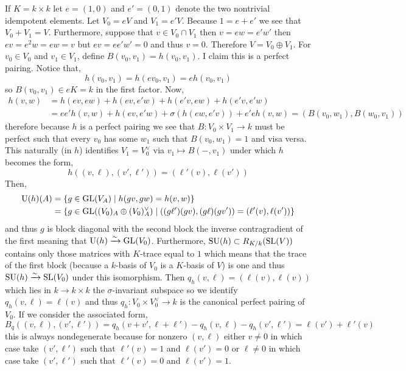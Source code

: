 \documentclass[12pt]{article}
\begin{document}
If $K = k \times k$ let $e = (1,0)$ and $e' = (0,1)$ denote the two nontrivial idempotent elements. Let $V_0 = e V$ and $V_1 = e' V$.
Because $1 = e + e'$ we see that $V_0 + V_1 = V$. Furthermore, suppose that $v \in V_0 \cap V_1$ then $v = e w = e' w'$ then $ev = e^2 w = ew = v$ but $ev = ee'w' = 0$ and thus $v = 0$. Therefore $V = V_0 \oplus V_1$. For $v_0 \in V_0$ and $v_1 \in V_1$, define $B(v_0, v_1) = h(v_0, v_1)$. I claim this is a perfect pairing. Notice that,
\[ h(v_0, v_1) = h(e v_0, v_1) = e h(v_0, v_1) \]
so $B(v_0, v_1) \in e K = k$ in the first factor. Now,
\begin{align*}
h(v, w) &= h(ev, ew) + h(ev, e'w) + h(e'v, ew) + h(e'v, e'w)
\\
& = e e' h(v,w) + h(ev, e'w) + \sigma(h(ew,e'v)) + e' e h(v, w) 
= (B(v_0, w_1), B(w_0, v_1))
\end{align*} 
therefore because $h$ is a perfect pairing we see that $B : V_0 \times  V_1 \to k$ must be perfect such that every $v_0$ has some $w_1$ such that $B(v_0, w_1) = 1$ and visa versa. This naturally (in $h$) identifies $V_1 = V_0^\vee$ via $v_1 \mapsto B(-,v_1)$ under which $h$ becomes the form,
\[ h((v, \ell), (v', \ell')) = (\ell'(v), \ell(v')) \]
Then,
\begin{align*}
\mathrm{U}(h)(A) & = \{ g \in \mathrm{GL}(V_A) \mid h(gv,gw) = h(v,w) \}
\\
& = \{ g \in \mathrm{GL}((V_0)_A \oplus (V_0)_A^\vee) \mid ((g \ell')(gv), (g \ell)(gv')) = (\ell'(v), \ell(v')) \}
\end{align*}
and thus $g$ is block diagonal with the second block the inverse contragradient of the first meaning that $\mathrm{U}(h) \xrightarrow{\sim} \mathrm{GL}(V_0)$. Furthermore, $\mathrm{SU}(h) \subset R_{K/k}(\mathrm{SL}(V))$ contains only those matrices with $K$-trace equal to $1$ which means that the trace of the first block (because a $k$-basis of $V_0$ is a $K$-basis of $V$) is one and thus $\mathrm{SU}(h) \xrightarrow{\sim} \mathrm{SL}(V_0)$ under this isomorphism.
Then $q_h(v,\ell) = (\ell(v), \ell(v))$ which lies in $k \to k \times k$ the $\sigma$-invariant subspace so we identify $q_h(v,\ell) = \ell(v)$ and thus $q_h : V_0 \times V_0^\vee \to k$ is the canonical perfect pairing of $V_0$. If we consider the associated form,
\[ B_{q}((v, \ell), (v', \ell')) = q_h(v + v', \ell + \ell') - q_h(v,\ell) - q_h(v',\ell') = \ell(v') + \ell'(v) \]
this is always nondegenerate because for nonzero $(v, \ell)$ either $v \neq 0$ in which case take $(v',\ell')$ such that $\ell'(v) = 1$ and $\ell(v') = 0$ or $\ell \neq 0$ in which case take $(v', \ell')$ such that $\ell'(v) = 0$ and $\ell(v') = 1$.
\end{document}
